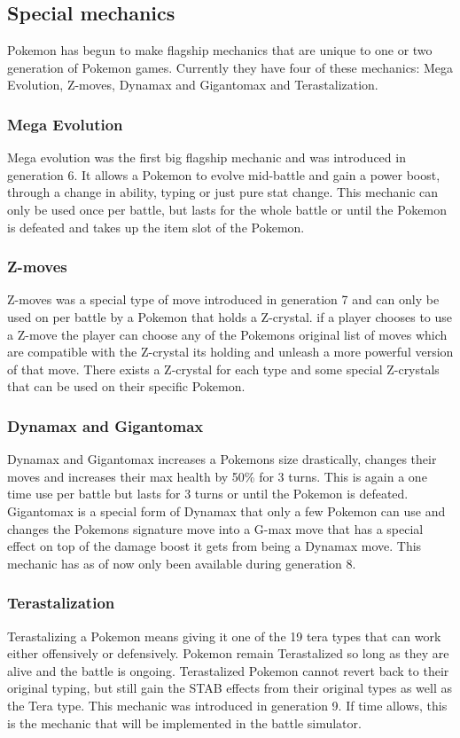 \subsection{Special mechanics}
Pokemon has begun to make flagship mechanics that are unique to one or two generation of Pokemon games.
Currently they have four of these mechanics: Mega Evolution, Z-moves, Dynamax and Gigantomax and Terastalization.
\subsubsection{Mega Evolution}
Mega evolution was the first big flagship mechanic and was introduced in generation 6. It allows a Pokemon to evolve mid-battle and gain a 
power boost, through a change in ability, typing or just pure stat change. This mechanic can only be used once per battle, but lasts for the whole battle
or until the Pokemon is defeated and takes up the item slot of the Pokemon.\cite{MegaEvolution}
\subsubsection{Z-moves}
Z-moves was a special type of move introduced in generation 7 and can only be used on per battle by a Pokemon that holds a Z-crystal. if a player chooses to 
use a Z-move the player can choose any of the Pokemons original list of moves which are compatible with the Z-crystal its holding and unleash a more powerful
version of that move. There exists a Z-crystal for each type and some special Z-crystals that can be used on their specific Pokemon. \cite{Zmoves}
\subsubsection{Dynamax and Gigantomax}
Dynamax and Gigantomax increases a Pokemons size drastically, changes their moves and increases their max health by 50\% for 3 turns. This is again a one time
use per battle but lasts for 3 turns or until the Pokemon is defeated. Gigantomax is a special form of Dynamax that only a few Pokemon can use and 
changes the Pokemons signature move into a G-max move that has a special effect on top of the damage boost it gets from being a Dynamax move.
This mechanic has as of now only been available during generation 8. \cite{Dynamax}
\subsubsection{Terastalization}
Terastalizing a Pokemon means giving it one of the 19 tera types that can work either offensively or defensively. Pokemon remain Terastalized so long 
as they are alive and the battle is ongoing. Terastalized Pokemon cannot revert back to their original typing, but still gain the STAB effects 
from their original types as well as the Tera type. This mechanic was introduced in generation 9. If time allows, this is the mechanic that will be
implemented in the battle simulator. \cite{TeraType} 
